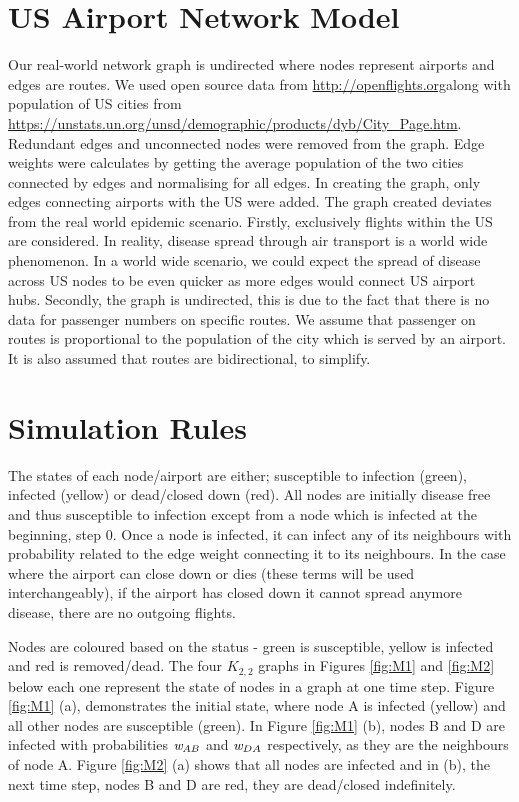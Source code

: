 \documentclass[a4paper,11pt]{article}
\begin{document}
\section{US Airport Network Model}

Our real-world network graph is undirected where nodes represent airports and edges are routes. We used open source data from \url{http://openflights.org}along with population of US cities from \url{https://unstats.un.org/unsd/demographic/products/dyb/City_Page.htm}. Redundant edges and unconnected nodes were removed from the graph. Edge weights were calculates by getting the average population of the two cities connected by edges and normalising for all edges. In creating the graph, only edges connecting airports with the US were added.
The graph created deviates from the real world epidemic scenario. Firstly, exclusively flights within the US are considered. In reality, disease spread through air transport is a world wide phenomenon. In a world wide scenario, we could expect the spread of disease across US nodes to be even quicker as more edges would connect US airport hubs. Secondly, the graph is undirected, this is due to the fact that there is no data for passenger numbers on specific routes. We assume that passenger on routes is proportional to the population of the city which is served by an airport. It is also assumed that routes are bidirectional, to simplify.


\section{Simulation Rules}

The states of each node/airport are either; susceptible to infection (green), infected (yellow) or dead/closed down (red). All nodes are initially disease free and thus susceptible to infection except from a node which is infected at the beginning, step 0. Once a node is infected, it can infect any of its neighbours with probability related to the edge weight connecting it to its neighbours. In the case where the airport can close down or dies (these terms will be used interchangeably), if the airport has closed down it cannot spread anymore disease, there are no outgoing flights. 


Nodes are coloured based on the status - green is susceptible, yellow is infected and red is removed/dead. The four $K_{2,2}$ graphs in Figures \ref{fig:M1} and \ref{fig:M2} below each one represent the state of nodes in a graph at one time step. Figure \ref{fig:M1} (a), demonstrates the initial state, where node A is infected (yellow) and all other nodes are susceptible (green). In Figure \ref{fig:M1} (b), nodes B and D are infected with probabilities ${\emph{w} _{AB}}$  and ${\emph{w}_{DA}}$ respectively, as they are the neighbours of node A. Figure \ref{fig:M2} (a) shows that all nodes are infected and in (b), the next time step, nodes B and D are red, they are dead/closed indefinitely. 
\end{document}
